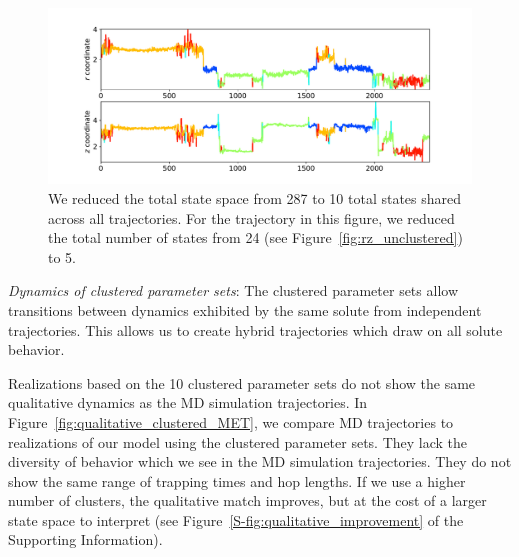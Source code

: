 \documentclass[journal=jpcbfk,manuscript=article]{achemso}
\begin{document}
  \begin{figure}
  \centering
  \includegraphics[width=\textwidth]{clustered_traj_MET_ward_10.pdf}
  \caption{We reduced the total state space from 287 to 10 total states 
  shared across all trajectories. For the trajectory in this figure, we reduced
  the total number of states from 24 (see Figure~\ref{fig:rz_unclustered}) to
  5.}\label{fig:clustered_traj_MET}
  \end{figure}
  
  \textit{Dynamics of clustered parameter sets}: The clustered parameter sets
  allow transitions between dynamics exhibited by the same solute from independent 
  trajectories. This allows us to create hybrid trajectories which draw on all
  solute behavior.
  
  Realizations based on the 10 clustered parameter sets do not show the same
  qualitative dynamics as the MD simulation trajectories. In 
  Figure~\ref{fig:qualitative_clustered_MET}, we compare MD trajectories to 
  realizations of our model using the clustered parameter sets. They lack the
  diversity of behavior which we see in the MD simulation trajectories.
  They do not show the same range of trapping times and hop lengths. If we use
  a higher number of clusters, the qualitative match improves, but at the cost
  of a larger state space to interpret (see Figure~\ref{S-fig:qualitative_improvement}
  of the Supporting Information).
  
\end{document}
